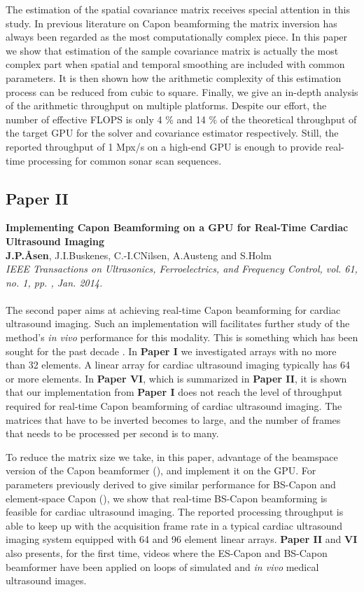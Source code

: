 The estimation of the spatial covariance matrix receives special attention in this study. In previous literature on Capon beamforming the matrix inversion has always been regarded as the most computationally complex piece. In this paper we show that estimation of the sample covariance matrix is actually the most complex part when spatial and temporal smoothing are included with common parameters. It is then shown how the arithmetic complexity of this estimation process can be reduced from cubic to square. Finally, we give an in-depth analysis of the arithmetic throughput on multiple platforms. Despite our effort, the number of effective FLOPS is only 4 \% and 14 \% of the theoretical throughput of the target GPU for the solver and covariance estimator respectively. Still, the reported throughput of 1 Mpx/s on a high-end GPU is enough to provide real-time processing for common sonar scan sequences.

\subsection{Paper II}
\textbf{Implementing Capon Beamforming on a GPU for Real-Time Cardiac Ultrasound Imaging}\\
\textbf{J.\:P.\:\AA{}sen}, J.\:I.\:Buskenes, C.-I.\:C\:Nilsen, A.\:Austeng and S.\:Holm\\
{\it IEEE Transactions on Ultrasonics, Ferroelectrics, and Frequency Control, vol. 61, no. 1, pp. , Jan. 2014.}\\\\
The second paper aims at achieving real-time Capon beamforming for cardiac ultrasound imaging. Such an implementation will facilitates further study of the method's \textit{in vivo} performance for this modality. This is something which has been sought for the past decade . In \textbf{Paper I} we investigated arrays with no more than 32 elements. A linear array for cardiac ultrasound imaging typically has 64 or more elements. In \textbf{Paper VI}, which is summarized in \textbf{Paper II}, it is shown that our implementation from  \textbf{Paper I} does not reach the level of throughput required for real-time Capon beamforming of cardiac ultrasound imaging. The matrices that have to be inverted becomes to large, and the number of frames that needs to be processed per second is to many.

To reduce the matrix size we take, in this paper, advantage of the beamspace version of the Capon beamformer (), and implement it on the GPU. For parameters previously derived to give similar performance for BS-Capon and element-space Capon (), we show that real-time BS-Capon beamforming is feasible for cardiac ultrasound imaging. The reported processing throughput is able to keep up with the acquisition frame rate in a typical cardiac ultrasound imaging system equipped with 64 and 96 element linear arrays.  \textbf{Paper II} and \textbf{VI} also presents, for the first time, videos where the ES-Capon and BS-Capon beamformer have been applied on loops of simulated and \textit{in vivo} medical ultrasound images.

